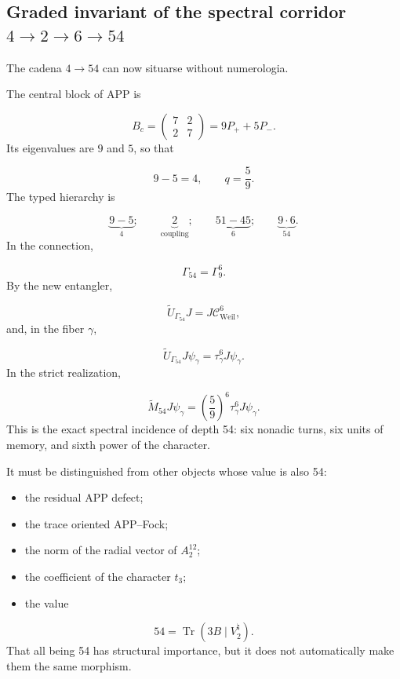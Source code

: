 \subsection{Graded invariant of the spectral corridor \(4\to2\to6\to54\)}
The cadena \(4\to54\) can now situarse without numerologia.\par
The central block of APP is\par
\[
B_c
=
\begin{pmatrix}
7&2\\
2&7
\end{pmatrix}
=
9P_++5P_-.
\]
Its eigenvalues are \(9\) and \(5\), so that\par
\[
9-5=4,
\qquad
q=\frac59.
\]
The typed hierarchy is\par
\[
\underbrace{9-5}_{4};
\qquad
\underbrace{2}_{\text{coupling}};
\qquad
\underbrace{51-45}_{6};
\qquad
\underbrace{9\cdot6}_{54}.
\]
In the connection,\par
\[
\Gamma_{54}=\Gamma_9^6.
\]
By the new entangler,\par
\[
\widetilde U_{\Gamma_{54}}J
=
J\mathcal C_{\mathrm{Weil}}^6,
\]
and, in the fiber \(\gamma\),\par
\[
\widetilde U_{\Gamma_{54}}J\psi_\gamma
=
\tau_\gamma^6J\psi_\gamma.
\]
In the strict realization,\par
\[
\widetilde M_{54}J\psi_\gamma
=
\left(\frac59\right)^6
\tau_\gamma^6J\psi_\gamma.
\]
This is the exact spectral incidence of depth 54: six nonadic turns, six units of memory, and sixth power of the character.\par
It must be distinguished from other objects whose value is also 54:\par
\begin{itemize}
\item the residual APP defect;
\item the trace oriented APP–Fock;
\item the norm of the radial vector of \(A_2^{12}\);
\item the coefficient of the character \(t_3\);
\item the value
\end{itemize}
  \[
  54=\operatorname{Tr}(3B\mid V^\natural_2).
  \]
That all being 54 has structural importance, but it does not automatically make them the same morphism.\par
{}
